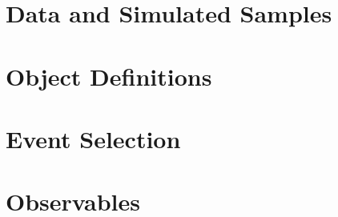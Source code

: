 \documentclass[UKenglish,texlive=2013]{\ATLASLATEXPATH atlasdoc}
\begin{document}

% 


\section{Data and Simulated Samples}
\label{sec:data-mc}


\clearpage

%

\clearpage

\section{Object Definitions}
\label{sec:objects}


\clearpage

\section{Event Selection}
\label{sec:evtselection}


\clearpage

\section{Observables}
\label{sec:variables}

\end{document}
